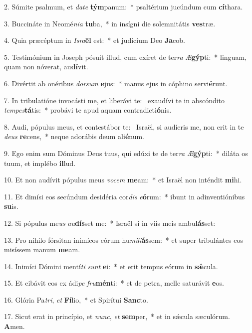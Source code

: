 2. Súmite psalmum, et \textit{da}\textit{te} \textbf{tým}panum:~*  psaltérium jucúndum cum \textbf{cí}thara.\

3. Buccináte in Neomé\textit{ni}\textit{a} \textbf{tu}ba,~*  in insígni die solemnitátis \textbf{ves}træ.\

4. Quia præcéptum in \textit{Is}\textit{ra}\textbf{ël} est:~*  et judícium Deo \textbf{Ja}cob.\

5. Testimónium in Joseph pósuit illud, cum exíret de ter\textit{ra} \textit{Æ}\textbf{gýp}ti:~*  linguam, quam non nóverat, au\textbf{dí}vit.\

6. Divértit ab onéribus \textit{dor}\textit{sum} \textbf{e}jus:~*  manus ejus in cóphino servi\textbf{é}runt.\

7. In tribulatióne invocásti me, et liberávi te: \dag\  exaudívi te in abscóndito \textit{tem}\textit{pes}\textbf{tá}tis:~*  probávi te apud aquam contradicti\textbf{ó}nis.\

8. Audi, pópulus meus, et contestábor te: \dag\  Israël, si audíeris me, non erit in te \textit{de}\textit{us} \textbf{re}cens,~*  neque adorábis deum ali\textbf{é}num.\

9. Ego enim sum Dóminus Deus tuus, qui edúxi te de ter\textit{ra} \textit{Æ}\textbf{gýp}ti:~*  diláta os tuum, et implébo \textbf{il}lud.\

10. Et non audívit pópulus meus \textit{vo}\textit{cem} \textbf{me}am:~*  et Israël non inténdit \textbf{mi}hi.\

11. Et dimísi eos secúndum desidéria cor\textit{dis} \textit{e}\textbf{ó}rum:~*  ibunt in adinventiónibus \textbf{su}is.\

12. Si pópulus me\textit{us} \textit{au}\textbf{dís}set me:~*  Israël si in viis meis ambu\textbf{lás}set:\

13. Pro níhilo fórsitan inimícos eórum hu\textit{mi}\textit{li}\textbf{ás}sem:~*  et super tribulántes eos misíssem manum \textbf{me}am.\

14. Inimíci Dómini mentí\textit{ti} \textit{sunt} \textbf{e}i:~*  et erit tempus eórum in \textbf{sǽ}cula.\

15. Et cibávit eos ex ádi\textit{pe} \textit{fru}\textbf{mén}ti:~*  et de petra, melle saturávit \textbf{e}os.\

16. Glória Pa\textit{tri}, \textit{et} \textbf{Fí}lio,~*  et Spirítui \textbf{Sanc}to.\

17. Sicut erat in princípio, et \textit{nunc}, \textit{et} \textbf{sem}per,~*  et in sǽcula sæculórum. \textbf{A}men.\

